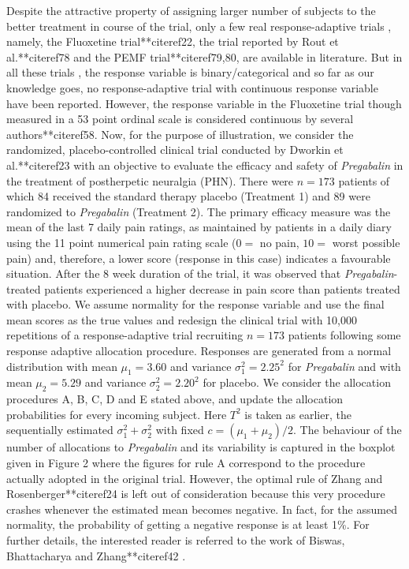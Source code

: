 Despite the attractive property of assigning larger number of subjects
to the better treatment in course of the trial, only a few real response-adaptive trials , namely, the Fluoxetine trial**citeref{22}, the trial reported by Rout et al.**citeref{78} and  the PEMF trial**citeref{79,80},  are available in literature. But in all these trials , the response variable is binary/categorical and so far as our knowledge goes, no response-adaptive trial with continuous response variable have been reported. However, the response variable in the Fluoxetine trial though measured in a 53 point ordinal scale is considered continuous by several authors**citeref{58}. Now, for the purpose of illustration, we consider  the randomized, placebo-controlled clinical trial conducted by Dworkin et al.**citeref{23} with an objective to evaluate the efficacy and safety of \textit{Pregabalin} in the treatment of postherpetic neuralgia (PHN). There were $n =173$ patients of which 84 received the standard therapy placebo (Treatment 1) and 89 were randomized to \textit{Pregabalin} (Treatment 2). The primary efficacy measure was the mean of the last 7 daily pain ratings, as maintained by patients in a daily diary using the 11 point numerical pain rating scale ($0=$ no pain, $10=$ worst possible pain) and, therefore, a lower score (response in this case) indicates a favourable situation. After the 8 week duration of the trial, it was observed that \textit{Pregabalin}-treated patients experienced a higher decrease in pain score than patients treated with placebo. We assume normality for the response variable and use the final mean scores as the true values  and redesign the clinical trial with 10,000 repetitions of a response-adaptive trial recruiting $n=173$ patients following some response adaptive allocation procedure. Responses are generated from a normal distribution with mean $\mu_{1}=3.60$ and variance $\sigma_{1}^{2} = 2.25^{2}$  for \textit{Pregabalin} and with mean $\mu_{2}=5.29$ and variance $\sigma_{2}^{2} = 2.20^{2}$  for placebo. We consider the  allocation procedures A, B, C, D and E stated above, and update the allocation probabilities for every incoming subject. Here $T^{2}$ is taken as earlier, the sequentially estimated $\sigma_{1}^{2}+\sigma_{2}^{2}$ with fixed $c=(\mu_{1}+\mu_{2})/2$.  The behaviour of the number of allocations to \textit{Pregabalin} and its variability is captured in the boxplot given in Figure 2 where the figures for rule A  correspond to the  procedure actually adopted in the original trial. However, the optimal rule of Zhang and Rosenberger**citeref{24} is left out of consideration because this very procedure crashes whenever the estimated mean becomes negative. In fact, for the assumed normality, the probability of getting a negative response is at least 1\%. For further details, the interested reader is referred to the work of Biswas, Bhattacharya and Zhang**citeref{42} .
